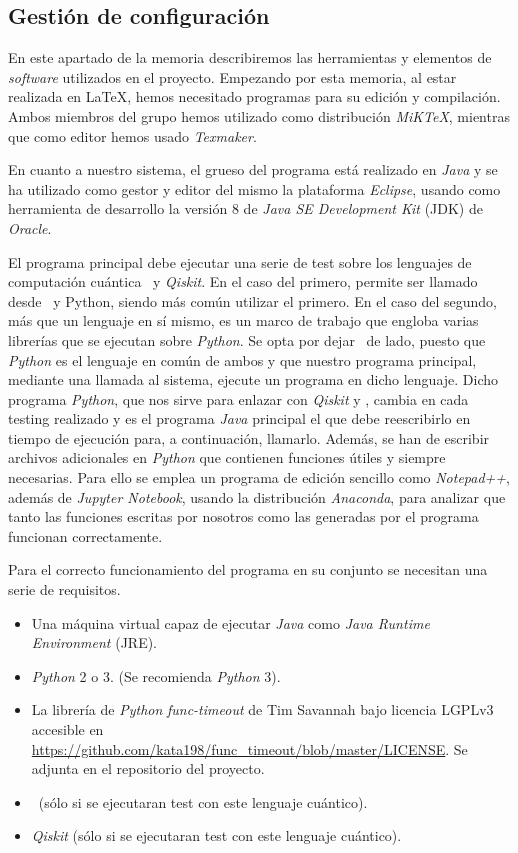 \subsection{Gestión de configuración}

En este apartado de la memoria describiremos las herramientas y elementos de \textit{software} utilizados en el proyecto. Empezando por esta memoria, al estar realizada en \LaTeX, hemos necesitado programas para su edición y compilación. Ambos miembros del grupo hemos utilizado como distribución \textit{MiKTeX}, mientras que como editor hemos usado \textit{Texmaker}.

En cuanto a nuestro sistema, el grueso del programa está realizado en \textit{Java} y se ha utilizado como gestor y editor del mismo la plataforma \textit{Eclipse}, usando como herramienta de desarrollo la versión 8 de \textit{Java SE Development Kit} (JDK) de \textit{Oracle}.

El programa principal debe ejecutar una serie de test sobre los lenguajes de computación cuántica \qsh\ y \textit{Qiskit}. En el caso del primero, permite ser llamado desde \csh\ y {Python}, siendo más común utilizar el primero. En el caso del segundo, más que un lenguaje en sí mismo, es un marco de trabajo que engloba varias librerías que se ejecutan sobre \textit{Python}. Se opta por dejar \csh\ de lado, puesto que \textit{Python} es el lenguaje en común de ambos y que nuestro programa principal, mediante una llamada al sistema, ejecute un programa en dicho lenguaje. Dicho programa \textit{Python}, que nos sirve para enlazar con \textit{Qiskit} y \qsh, cambia en cada testing realizado y es el programa \textit{Java} principal el que debe reescribirlo en tiempo de ejecución para, a continuación, llamarlo. Además, se han de escribir archivos adicionales en \textit{Python} que contienen funciones útiles y siempre necesarias. Para ello se emplea un programa de edición sencillo como \textit{Notepad++}, además de \textit{Jupyter Notebook}, usando la distribución \textit{Anaconda}, para analizar que tanto las  funciones escritas por nosotros como las generadas por el programa funcionan correctamente.

Para el correcto funcionamiento del programa en su conjunto se necesitan una serie de requisitos.

\begin{itemize}
\item Una máquina virtual capaz de ejecutar \textit{Java} como \textit{Java Runtime Environment} (JRE).
\item \textit{Python} 2 o 3. (Se recomienda \textit{Python} 3).
\item La librería de \textit{Python} \textit{func-timeout} de Tim Savannah bajo licencia LGPLv3 accesible en \url{https://github.com/kata198/func\_timeout/blob/master/LICENSE}. Se adjunta en el repositorio del proyecto.
\item \qsh\ (sólo si se ejecutaran test con este lenguaje cuántico).
\item \textit{Qiskit} (sólo si se ejecutaran test con este lenguaje cuántico).
\end{itemize}

